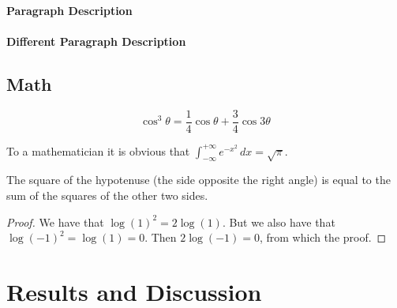 \documentclass[
    10pt, %
    a4paper, %
    oneside, %
    headinclude,footinclude, %
    BCOR5mm, %
]{scrartcl}
\begin{document}
    \lipsum[6] %

    \paragraph{Paragraph Description} \lipsum[7] %

    \paragraph{Different Paragraph Description} \lipsum[8] %


    \subsection{Math}

    \lipsum[4] %

    \begin{equation}
        \cos^3 \theta =\frac{1}{4}\cos\theta+\frac{3}{4}\cos 3\theta
        \label{eq:refname2}
    \end{equation}

    \lipsum[5] %

    \begin{definition}[Gauss]
        To a mathematician it is obvious that
        $\int_{-\infty}^{+\infty}
        e^{-x^2}\,dx=\sqrt{\pi}$.
    \end{definition}

    \begin{theorem}[Pythagoras]
        The square of the hypotenuse (the side opposite the right angle) is equal to the sum of the squares of the other two sides.
    \end{theorem}

    \begin{proof}
        We have that $\log(1)^2 = 2\log(1)$.
        But we also have that $\log(-1)^2=\log(1)=0$.
        Then $2\log(-1)=0$, from which the proof.
    \end{proof}



    \section{Results and Discussion}
\end{document}
